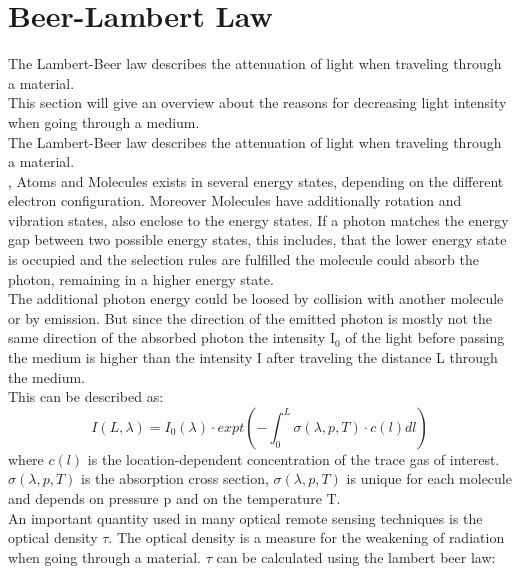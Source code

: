 \documentclass  [
  paper    = a4,
  BCOR     = 10mm,
  twoside,
  fontsize = 12pt,
  fleqn,
  toc      = bibnumbered,
  toc      = listofnumbered,
  numbers  = noendperiod,
  headings = normal,
  listof   = leveldown,
  version  = 3.03
]                                       {scrreprt}
\begin{document}
	\section*{Beer-Lambert Law}
	The Lambert-Beer law describes the attenuation of light when traveling through a material.\\
	This section will give an overview about the reasons for decreasing light intensity when going through a medium.\\
	The Lambert-Beer law describes the attenuation of light when traveling through a material.\\
                                                                                                                                                                                                                                                                                       ,
	Atoms and Molecules exists in several energy states, depending on the different electron configuration. Moreover Molecules have additionally rotation and vibration states, also enclose to the energy states. If a photon matches the energy gap between two possible energy states, this includes, that the lower energy state is occupied and the selection rules are fulfilled  the molecule could absorb the photon, remaining in a higher energy state.\\
	The additional photon energy could be loosed by collision with another molecule or by emission. But since the direction of the emitted photon is mostly not the same direction of the absorbed photon the intensity I$_{0}$ of the light before passing the medium is higher than the intensity I after traveling the distance L through the medium.\\
	This can be described as:\\ 
	\begin{equation}
	I\left(L,\lambda\right) = I_{0}\left(\lambda\right)\cdot expt\left(-\int^{L}_{0}\sigma\left(\lambda,p,T\right)\cdot c\left(l\right)dl\right)
	\end{equation}
	where $c\left(l\right)$ is the location-dependent concentration of the trace gas of interest. $\sigma\left(\lambda,p,T\right)$ is the absorption cross section, $\sigma\left(\lambda,p,T\right)$ is unique for each molecule and depends on pressure p and on the temperature T.\\
	An important quantity used in many optical remote sensing techniques is the optical density $\tau$. The optical density is a measure for the weakening of radiation when going through a material. $\tau$ can be calculated using the lambert beer law:
\end{document}
